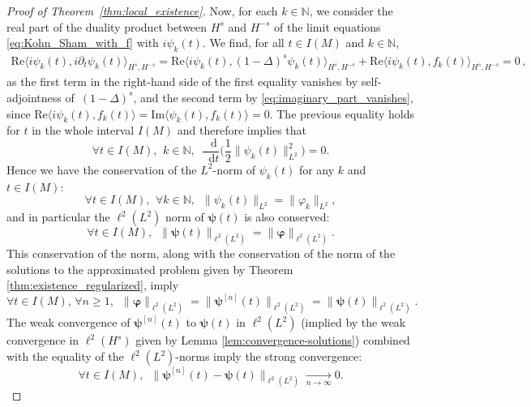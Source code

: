 \documentclass[12pt,a4paper]{amsart}
\numberwithin{equation}{section}
\newcommand{\ulpsi}{\boldsymbol{\psi}}
\newcommand{\ulphi}{\boldsymbol{\varphi}}
\newcommand*\diff{\mathop{}\!\mathrm{d}}
\begin{document}
\begin{proof}[Proof of Theorem~\ref{thm:local_existence}]
		Now, for each $ k \in \mathbb{N} $, we consider the real part of the duality product between $ H^{s}$ and $H^{-s} $ of the limit equations \eqref{eq:Kohn_Sham_with_f} with $ i \psi_k(t) $. We find, for all $t \in I(M)$ and $k \in \mathbb{N},  $ 
		\begin{multline}
			\mathrm{Re} \langle i \psi_k(t) , i \partial_t \psi_k(t) \rangle_{H^{s},H^{-s}} 
			=  \mathrm{Re} \langle i \psi_k(t) , (1-\Delta)^s \psi_k(t) \rangle_{H^{s},H^{-s}} + \mathrm{Re} \langle i \psi_k(t) , f_{k}(t) \rangle_{H^{s},H^{-s}} = 0\,,
		\end{multline}
		as the first term in the right-hand side of the first equality vanishes by self-adjointness of~$ (1-\Delta)^s $, and the second term by \eqref{eq:imaginary_part_vanishes}, since $ \mathrm{Re} \langle i \psi_k(t) , f_k(t) \rangle = \mathrm{Im} \langle \psi_k(t) , f_k(t) \rangle = 0 $. The previous equality holds for $t$ in the whole interval $I(M)$ and therefore implies that 
		\begin{equation}
			\forall t \in I(M), \,\ k \in \mathbb{N}, \;\ \frac{\diff }{\diff t} \Big( \frac{1}{2} \| \psi_k(t) \|_{L^2}^2 \Big) = 0 .
		\end{equation}
		Hence we have the conservation of the $L^2$-norm of $\psi_k(t)$ for any $k$ and $t\in I(M)$: 
		\begin{equation}
			\forall t \in I(M), \,\ \forall k \in \mathbb{N}, \;\  \| \psi_k(t) \|_{L^2} = \| \varphi_k \|_{L^2} ,
		\end{equation}
		and in particular the $ \ell^2(L^2) $ norm of $\ulpsi(t)$ is also conserved:
		\begin{equation}
			\forall t \in I(M),  \;\ \| \ulpsi(t) \|_{\ell^2(L^2)} = \| \ulphi \|_{\ell^2(L^2)} .
		\end{equation}
		This conservation of the norm, along with the conservation of the norm of the solutions to the approximated problem given by Theorem \ref{thm:existence_regularized}, imply
		\begin{equation}
			\forall t \in I(M),\, \forall n \geq 1,  \;\  \| \ulphi \|_{\ell^2(L^2)} = \| \ulpsi^{[n]}(t) \|_{\ell^2(L^2)} %
			= \| \ulpsi(t) \|_{\ell^2(L^2)}.
		\end{equation}
		The weak convergence of $\ulpsi^{[n]}(t)$ to $\ulpsi(t)$ in $\ell^2(L^2)$ (implied by the weak convergence in $\ell^2(H^s)$ given by Lemma \ref{lem:convergence-solutions}) combined with the equality of the $\ell^2(L^2)$-norms imply the strong convergence: 
		\begin{equation}\label{lim:strong_convergence_ell_L2}
			\forall t \in I(M),  \;\ \|\ulpsi^{[n]}(t)-\ulpsi(t)\|_{\ell^2(L^2)} \xrightarrow[n\to\infty]{}0  .
		\end{equation}
		

\end{proof}
\end{document}
